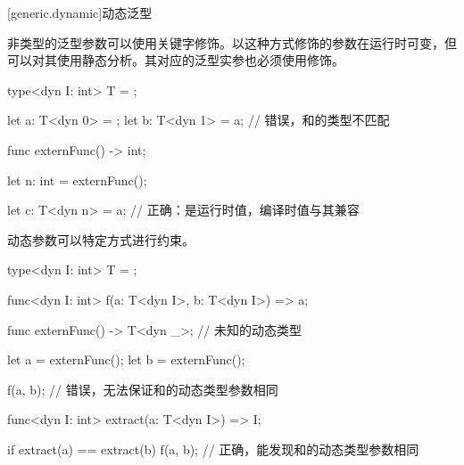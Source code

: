 [generic.dynamic]{动态泛型}

\pnum
非类型的泛型参数可以使用关键字修饰。以这种方式修饰的参数在运行时可变，但可以对其使用静态分析。其对应的泛型实参也必须使用修饰。

\enterexample
\begin{codeblock}

type<dyn I: int> T = { };

let a: T<dyn 0> = { };
let b: T<dyn 1> = a; // 错误，和的类型不匹配

func externFunc() -> int;

let n: int = externFunc();

let c: T<dyn n> = a; // 正确：是运行时值，编译时值与其兼容

\end{codeblock}
\exitexample

\pnum
动态参数可以特定方式进行约束。

\enterexample
\begin{codeblock}

type<dyn I: int> T = { };

func<dyn I: int> f(a: T<dyn I>, b: T<dyn I>) => a;

func externFunc() -> T<dyn _>; // 未知的动态类型

let a = externFunc();
let b = externFunc();

f(a, b); // 错误，无法保证和的动态类型参数相同

func<dyn I: int> extract(a: T<dyn I>) => I;

if extract(a) == extract(b) {
    f(a, b); // 正确，能发现和的动态类型参数相同
}

\end{codeblock}
\exitexample